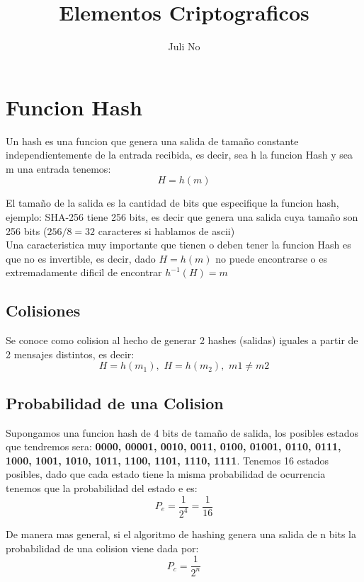 \documentclass{article}
\title{Elementos Criptograficos}
\author{Juli No}
\newcommand{\SP}{\,\,}
\begin{document}
\maketitle
\pagebreak

\section{Funcion Hash}
Un hash es una funcion que genera una salida de tamaño constante independientemente
de la entrada recibida, es decir, sea h la funcion Hash y sea
m una entrada tenemos:
$$
H = h(m)
$$

El tamaño de la salida es la cantidad de bits que especifique la funcion hash,
ejemplo: SHA-256 tiene 256 bits, es decir que genera una salida cuya tamaño son 256
bits ($256/8 = 32$ caracteres si hablamos de ascii)\\

Una caracteristica muy importante que tienen o deben tener la funcion Hash es que
no es invertible, es decir, dado $H = h(m)$ no puede encontrarse o es extremadamente
dificil de encontrar $h^{-1}(H) = m$

\subsection{Colisiones}
Se conoce como colision al hecho de generar 2 hashes (salidas) iguales a partir de 2 mensajes distintos,
es decir:
$$
H = h(m_{1}), \SP H = h(m_{2}), \SP m1 \neq m2
$$

\subsection{Probabilidad de una Colision}
Supongamos una funcion hash de 4 bits de tamaño de salida, los posibles estados
que tendremos sera: \textbf{0000, 00001, 0010, 0011, 0100, 01001, 0110, 0111, 1000,
1001, 1010, 1011, 1100, 1101, 1110, 1111}. Tenemos 16 estados posibles, dado que cada
estado tiene la misma probabilidad de ocurrencia tenemos que la probabilidad del estado
e es:
$$
P_{e} = \frac{1}{2^4} = \frac{1}{16}
$$

De manera mas general, si el algoritmo de hashing genera una salida de n bits
la probabilidad de una colision viene dada por:
$$
P_{c} = \frac{1}{2^n}
$$
\end{document}
